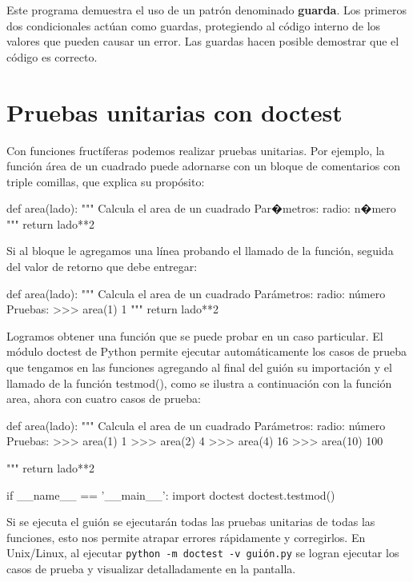 Este programa demuestra el uso de un patrón denominado \textbf{guarda}.
Los primeros dos condicionales actúan como guardas, protegiendo al
código interno de los valores que pueden causar un error. Las guardas
hacen posible demostrar que el código es correcto.

\section{Pruebas unitarias con doctest}

Con funciones fructíferas podemos realizar pruebas unitarias. Por
ejemplo, la función área de un cuadrado puede adornarse con un bloque
de comentarios con triple comillas, que explica su propósito:

\begin{pythoncode}
def area(lado):
    """ Calcula el area de un cuadrado
        Par�metros:
            radio: n�mero
    """
    return lado**2
\end{pythoncode}
 

Si al bloque le agregamos una línea probando el llamado de la función,
seguida del valor de retorno que debe entregar:

\begin{pythoncode}
def area(lado):
    """ Calcula el area de un cuadrado
        Parámetros:
            radio: número
        Pruebas:
        >>> area(1)
        1        
    """
    return lado**2
\end{pythoncode}

Logramos obtener una función que se puede probar en un caso particular.
El módulo doctest de Python permite ejecutar automáticamente los casos
de prueba que tengamos en las funciones agregando al final del guión
su importación y el llamado de la función testmod(), como se ilustra
a continuación con la función area, ahora con cuatro casos de prueba:

\begin{pythoncode}
def area(lado):
    """ Calcula el area de un cuadrado
        Parámetros:
            radio: número
        Pruebas:
        >>> area(1)
        1
        >>> area(2)
        4
        >>> area(4)
        16
        >>> area(10)
        100
        
    """
    return lado**2

if __name__ == '__main__':
    import doctest
    doctest.testmod()
\end{pythoncode}

Si se ejecuta el guión se ejecutarán todas las pruebas unitarias de
todas las funciones, esto nos permite atrapar errores rápidamente
y corregirlos. En Unix/Linux, al ejecutar \verb+python -m doctest -v guión.py+
se logran ejecutar los casos de prueba y visualizar detalladamente
en la pantalla.

